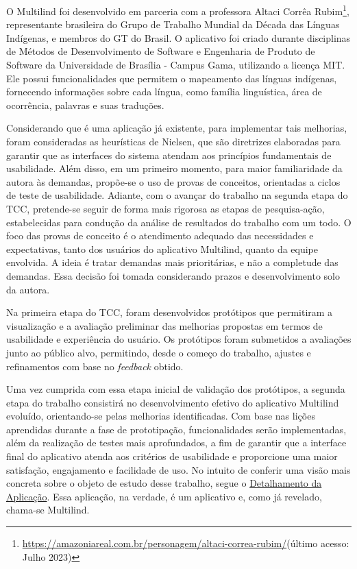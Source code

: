 O Multilind foi desenvolvido em parceria com a professora Altaci Corrêa Rubim\footnote{\url{https://amazoniareal.com.br/personagem/altaci-correa-rubim/}(último acesso: Julho 2023)}, representante brasileira do Grupo de Trabalho Mundial da Década das Línguas Indígenas, 
e membros do GT do Brasil. O aplicativo foi criado durante disciplinas de Métodos de Desenvolvimento de Software e Engenharia de Produto de Software da Universidade de Brasília - Campus Gama, utilizando a licença MIT. Ele possui funcionalidades que permitem o mapeamento 
das línguas indígenas, fornecendo informações sobre cada língua, como família linguística, área de ocorrência, palavras e suas traduções.

Considerando que é uma aplicação já existente, para implementar tais melhorias, foram consideradas as heurísticas de Nielsen, que são diretrizes elaboradas para garantir que as interfaces do sistema atendam aos princípios fundamentais de usabilidade. Além disso, em um 
primeiro momento, para maior familiaridade da autora às demandas, propõe-se o uso de provas de conceitos, orientadas a ciclos de teste de usabilidade. Adiante, com o avançar do trabalho na segunda etapa do TCC, pretende-se seguir de forma mais rigorosa as etapas de 
pesquisa-ação, estabelecidas para condução da análise de resultados do trabalho com um todo. O foco das provas de conceito é o atendimento adequado das necessidades e expectativas, tanto dos usuários do aplicativo Multilind, quanto da equipe envolvida. A ideia é tratar 
demandas mais prioritárias, e não a completude das demandas. Essa decisão foi tomada considerando prazos e desenvolvimento solo da autora.

Na primeira etapa do TCC, foram desenvolvidos protótipos que permitiram a visualização e a avaliação preliminar das melhorias propostas em termos de usabilidade e experiência do usuário. Os protótipos 
foram submetidos a avaliações junto ao público alvo, permitindo, desde o começo do trabalho, ajustes e refinamentos com base no \textit{feedback} obtido. 

Uma vez cumprida com essa etapa inicial de validação dos protótipos, a segunda etapa do trabalho consistirá no desenvolvimento efetivo do aplicativo Multilind evoluído, orientando-se pelas melhorias identificadas. Com base nas lições aprendidas durante a fase de prototipação, 
funcionalidades serão implementadas, além da realização de testes mais aprofundados, a fim de garantir que a interface final do aplicativo atenda aos critérios de usabilidade e proporcione uma maior satisfação, engajamento e facilidade de uso. No intuito de conferir uma visão 
mais concreta sobre o objeto de estudo desse trabalho, segue o \hyperref[sec:Detalhamento da Aplicacao]{Detalhamento da Aplicação}. Essa aplicação, na verdade, é um aplicativo e, como já revelado, chama-se Multilind.
	
